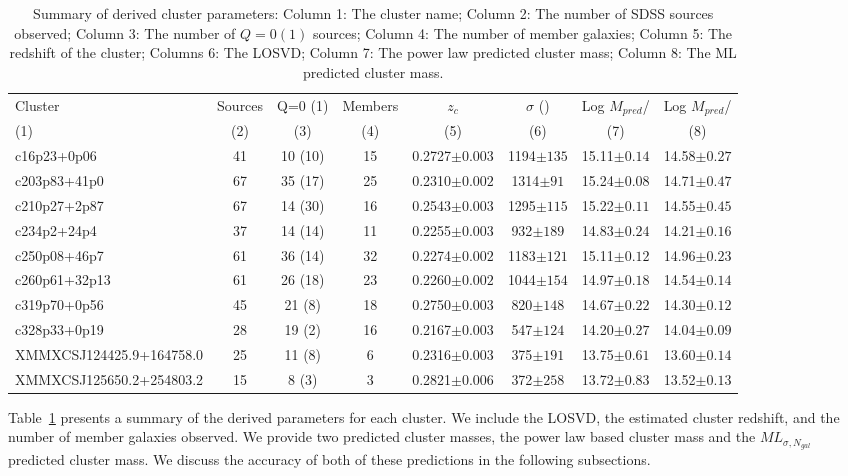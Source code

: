 \begin{table}
	\centering 
	\caption{Summary of derived cluster parameters: Column 1: The cluster name; Column 2: The number of SDSS sources observed; Column 3: The number of $Q=0(1)$ sources; Column 4: The number of member galaxies; Column 5: The redshift of the cluster; Columns 6: The LOSVD; Column 7: The power law predicted cluster mass; Column 8: The ML predicted cluster mass.} 
	\begin{tabular}
		{lccccccc} \hline Cluster & Sources & Q=0 (1) & Members & $z_{c}$ & $\sigma$ (\kms) & Log $M_{pred}$/\Msol & Log $M_{pred}$/\Msol \\
		(1) & (2) & (3) & (4) & (5) & (6) & (7) & (8) \\
		\hline \hline 
		c16p23+0p06 & 41 & 10 (10) & 15 & 0.2727$\pm{0.003}$ & 1194$\pm{135}$ & 15.11$\pm{0.14}$ & 14.58$\pm{0.27}$ \\
		c203p83+41p0 & 67 & 35 (17) & 25 & 0.2310$\pm{0.002}$ & 1314$\pm{91}$ & 15.24$\pm{0.08}$ & 14.71$\pm{0.47}$ \\
		c210p27+2p87 & 67 & 14 (30) & 16 & 0.2543$\pm{0.003}$ & 1295$\pm{115}$ & 15.22$\pm{0.11}$ & 14.55$\pm{0.45}$ \\
		c234p2+24p4 & 37 & 14 (14) & 11 & 0.2255$\pm{0.003}$ & 932$\pm{189}$ & 14.83$\pm{0.24}$ & 14.21$\pm{0.16}$ \\
		c250p08+46p7 & 61 & 36 (14) & 32 & 0.2274$\pm{0.002}$ & 1183$\pm{121}$ & 15.11$\pm{0.12}$ & 14.96$\pm{0.23}$ \\
		c260p61+32p13 & 61 & 26 (18) & 23 & 0.2260$\pm{0.002}$ & 1044$\pm{154}$ & 14.97$\pm{0.18}$ & 14.54$\pm{0.14}$ \\
		c319p70+0p56 & 45 & 21 (8) & 18 & 0.2750$\pm{0.003}$ & 820$\pm{148}$ & 14.67$\pm{0.22}$ & 14.30$\pm{0.12}$ \\
		c328p33+0p19 & 28 & 19 (2) & 16 & 0.2167$\pm{0.003}$ & 547$\pm{124}$ & 14.20$\pm{0.27}$ & 14.04$\pm{0.09}$ \\
		XMMXCSJ124425.9+164758.0 & 25 & 11 (8) & 6 & 0.2316$\pm{0.003}$ & 375$\pm{191}$ & 13.75$\pm{0.61}$ & 13.60$\pm{0.14}$ \\
		XMMXCSJ125650.2+254803.2 & 15 & 8 (3) & 3 & 0.2821$\pm{0.006}$ & 372$\pm{258}$ & 13.72$\pm{0.83}$ & 13.52$\pm{0.13}$ \\
		\hline 
	\end{tabular}
	\label{tbl: derived parameters} 
\end{table}

Table~\ref{tbl: derived parameters} presents a summary of the derived parameters for each cluster. We include the LOSVD, the estimated cluster redshift, and the number of member galaxies observed. We provide two predicted cluster masses, the power law based cluster mass and the $ML_{\sigma, N_{gal}}$ predicted cluster mass. We discuss the accuracy of both of these predictions in the following subsections.


